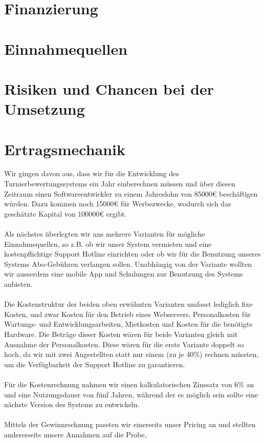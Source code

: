 \section{Finanzierung}
\section{Einnahmequellen}
\section{Risiken und Chancen bei der Umsetzung}

\section{Ertragsmechanik}
Wir gingen davon aus, dass wir für die Entwicklung des Turnierbewertungssystems ein Jahr einberechnen müssen und über diesen Zeitraum
    einen Softwareentwickler zu einem Jahreslohn von 85000€ beschäftigen würden.
Dazu kommen noch 15000€ für Werbezwecke, wodurch sich das geschätzte Kapital von 100000€ ergibt.
\\\\
Als nächstes überlegten wir uns mehrere Varianten für mögliche Einnahmequellen, so z.B. ob wir unser System vermieten und eine kostenpflichtige Support Hotline einrichten oder ob wir für die Benutzung unseres Systems Abo-Gebühren verlangen sollen.
Unabhängig von der Variante wollten wir ausserdem eine mobile App und Schulungen zur Benutzung des Systems anbieten.
\\\\
Die Kostenstruktur der beiden oben erwähnten Varianten umfasst lediglich fixe Kosten, und zwar Kosten für den Betrieb eines Webservers,
    Personalkosten für Wartungs- und Entwicklungsarbeiten, Mietkosten und Kosten für die benötigte Hardware.
Die Beträge dieser Kosten wären für beide Varianten gleich mit Ausnahme der Personalkosten.
Diese wären für die erste Variante doppelt so hoch, da wir mit zwei Angestellten statt nur einem (zu je 40\%) rechnen müssten,
    um die Verfügbarkeit der Support Hotline zu garantieren.
\\\\
Für die Kostenrechnung nahmen wir einen kalkulatorischen Zinssatz von 6\% an und eine Nutzungsdauer von fünf Jahren,
    während der es möglich sein sollte eine nächste Version des Systems zu entwickeln.
\\\\
Mittels der Gewinnrechnung passten wir einerseits unser Pricing an und stellten andererseits unsere Annahmen auf die Probe,
